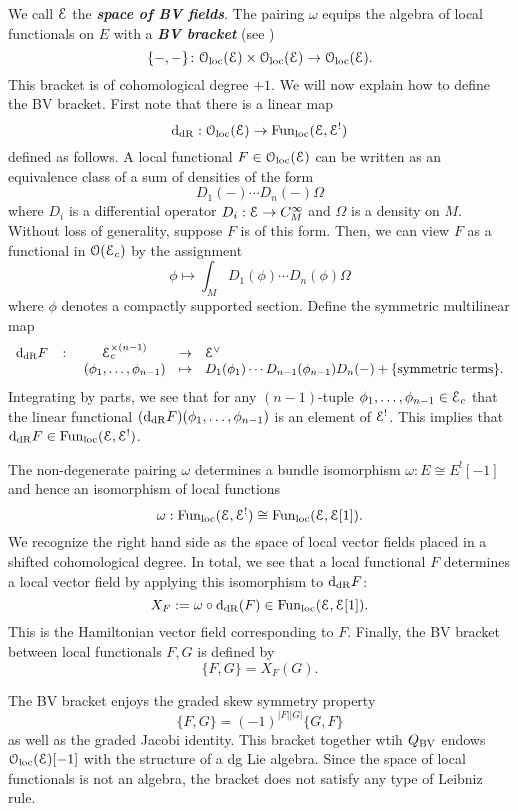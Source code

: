 \documentclass[10pt, oneside]{article}
\newcommand{\defterm}[1]{\textbf{\emph{#1}}}
\begin{document}
We call $\mathcal E$ the \defterm{space of BV fields}. The pairing $\omega$ equips the algebra of local functionals on $E$ with a \defterm{BV bracket} (see \cite[Chapter 5.3]{CostelloBook}) 
\[
\{-,-\}\colon \mathcal{O}_{\rm loc}(\mathcal E) \times \mathcal{O}_{\rm loc}(\mathcal E) \to \mathcal{O}_{\rm loc}(\mathcal E) .
\]
This bracket is of cohomological degree $+1$. 
We will now explain how to define the BV bracket.  First note that there is a linear map
\[
{\rm d}_{\mathrm{dR}} : \mathcal{O}_{\rm loc}(\mathcal E) \to {\rm Fun}_{\rm loc}(\mathcal E, \mathcal E^!) 
\]
defined as follows. 
A local functional $F \in  \mathcal{O}_{\rm loc}(\mathcal E)$ can be written as an equivalence class of a sum of densities of the form
\[
D_1(-) \cdots D_n(-) \Omega
\]
where $D_i$ is a differential operator $D_i : \mathcal E \to C^\infty_M$ and $\Omega$ is a density on $M$. 
Without loss of generality, suppose $F$ is of this form. 
Then, we can view $F$ as a functional in $\mathcal O(\mathcal E_c)$ by the assignment
\[
\phi \mapsto \int_M D_1(\phi) \cdots D_n(\phi) \Omega
\]
where $\phi$ denotes a compactly supported section. 
Define the symmetric multilinear map
\[
\begin{array}{ccccl}
{\rm d}_{\mathrm{dR}} F & \colon & \mathcal E_c^{\times (n-1)} & \to & \mathcal E^\vee \\
& & (\phi_1, \ldots, \phi_{n-1}) & \mapsto & D_1(\phi_1) \cdots D_{n-1}(\phi_{n-1}) D_{n} (-) + \{{\rm symmetric\;terms}\} .
\end{array}
\]
Integrating by parts, we see that for any $(n-1)$-tuple $\phi_1, \ldots, \phi_{n-1} \in \mathcal E_c$ that the linear functional $({\rm d}_{\mathrm{dR}} F) (\phi_1,\ldots, \phi_{n-1})$ is an element of $\mathcal E^!$. 
This implies that ${\rm d}_{\mathrm{dR}} F \in {\rm Fun}_{\rm loc}(\mathcal E, \mathcal E^!)$.

The non-degenerate pairing $\omega$ determines a bundle isomorphism $\omega \colon E \cong E^! [-1]$ and hence an isomorphism of local functions
\[
\omega : {\rm Fun}_{\rm loc}(\mathcal E, \mathcal E^!) \cong {\rm Fun}_{\rm loc}(\mathcal E, \mathcal E[1]) .
\]
We recognize the right hand side as the space of local vector fields placed in a shifted cohomological degree.
In total, we see that a local functional $F$ determines a local vector field by applying this isomorphism to ${\rm d}_{\mathrm{dR}}F$:
\[
X_F := \omega \circ {\rm d}_{\mathrm{dR}} (F) \in  {\rm Fun}_{\rm loc}(\mathcal E, \mathcal E[1])  .
\]
This is the Hamiltonian vector field corresponding to $F$. 
Finally, the BV bracket between local functionals $F, G$ is defined by
\[
\{F, G\} = X_F (G) .
\]

The BV bracket enjoys the graded skew symmetry property
\[
\{F, G\} = (-1)^{|F| |G|} \{G, F\}
\]
as well as the graded Jacobi identity.
This bracket together wtih $Q_{\mathrm{BV}}$ endows $\mathcal{O}_{\rm loc}(\mathcal E)[-1]$ with the structure of a dg Lie algebra. 
Since the space of local functionals is not an algebra, the bracket does not satisfy any type of Leibniz rule. 
\end{document}
